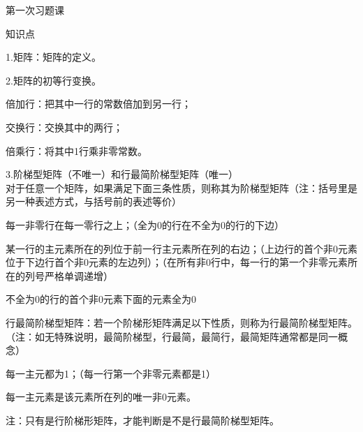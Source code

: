\documentclass{article}
\begin{document}
\newenvironment{tips}{\kaishu\zihao{-6}\color{blue}{\noindent\rule[-3pt]{\textwidth}{0.5pt}\par \em \noindent {\zihao{-5} \textcolor[rgb]{1.00,0.00,0.00}{Tips}}}\par}{\\ \rule[3mm]{\textwidth}{0.5pt}\par}
 \renewcommand{\thenum}{\arabic{num}.} \newcommand{\num}{\refstepcounter{num}\text{\thenum}}

\hphantom{~~}\hfill {\heiti 第一次习题课} \hfill\hphantom{~~}

\hphantom{~~}\hfill {\heiti 知识点} \hfill\hphantom{~~}

1.矩阵：矩阵的定义。

2.矩阵的初等行变换。
\begin{asparaenum}[(1)]
\item 倍加行：把其中一行的常数倍加到另一行；
\item 交换行：交换其中的两行；
\item 倍乘行：将其中1行乘非零常数。
\end{asparaenum}

3.阶梯型矩阵（不唯一）和行最简阶梯型矩阵（唯一）\\
对于任意一个矩阵，如果满足下面三条性质，则称其为\textcolor[rgb]{1.00,0.00,0.00}{阶梯型矩阵}（注：括号里是另一种表述方式，与括号前的表述等价）
\begin{asparaenum}[(1)]
\item 每一非零行在每一零行之上；（全为0的行在不全为0的行的下边）
\item 某一行的主元素所在的列位于前一行主元素所在列的右边；（上边行的首个非0元素位于下边行首个非0元素的左边列）；（在所有非0行中，每一行的第一个非零元素所在的列号严格单调递增）
\item 不全为0的行的首个非0元素下面的元素全为0
\end{asparaenum}
行最简阶梯型矩阵：若一个阶梯形矩阵满足以下性质，则称为\textcolor[rgb]{1.00,0.00,0.00}{行最简阶梯型矩阵}。（\textcolor[rgb]{0.00,1.00,0.25}{注：如无特殊说明，最简阶梯型，行最简，最简行，最简矩阵通常都是同一概念}）
\begin{asparaenum}[(1)]
\item 每一主元都为1；（每一行第一个非零元素都是1）
\item 每一主元素是该元素所在列的唯一非0元素。
\end{asparaenum}
注：只有是行阶梯形矩阵，才能判断是不是行最简阶梯型矩阵。
\end{document}
